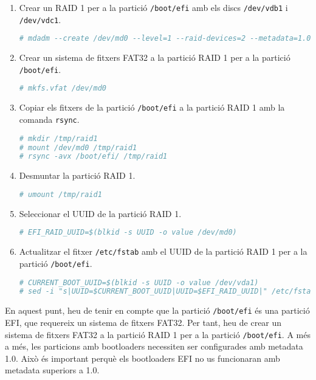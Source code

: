 \begin{enumerate}
        \item Crear un RAID 1 per a la partició \texttt{/boot/efi} amb els discs \texttt{/dev/vdb1} i \texttt{/dev/vdc1}.
\begin{lstlisting}[language=bash, numbers=none, commentstyle=\color{black}]
# mdadm --create /dev/md0 --level=1 --raid-devices=2 --metadata=1.0 /dev/vdb1 /dev/vdc1
\end{lstlisting}
        \item Crear un sistema de fitxers FAT32 a la partició RAID 1 per a la partició \texttt{/boot/efi}.
\begin{lstlisting}[language=bash, numbers=none, commentstyle=\color{black}]
# mkfs.vfat /dev/md0
\end{lstlisting}
        \item Copiar els fitxers de la partició \texttt{/boot/efi} a la partició RAID 1 amb la comanda \texttt{rsync}.
\begin{lstlisting}[language=bash, numbers=none, commentstyle=\color{black}]
# mkdir /tmp/raid1
# mount /dev/md0 /tmp/raid1
# rsync -avx /boot/efi/ /tmp/raid1
\end{lstlisting}
        \item Desmuntar la partició RAID 1.
\begin{lstlisting}[language=bash, numbers=none, commentstyle=\color{black}]
# umount /tmp/raid1
\end{lstlisting}
        \item Seleccionar el UUID de la partició RAID 1.
\begin{lstlisting}[language=bash, numbers=none, commentstyle=\color{black}]
# EFI_RAID_UUID=$(blkid -s UUID -o value /dev/md0)
\end{lstlisting}
        \item Actualitzar el fitxer \texttt{/etc/fstab} amb el UUID de la partició RAID 1 per a la partició \texttt{/boot/efi}.
\begin{lstlisting}[language=bash, numbers=none, commentstyle=\color{black}]
# CURRENT_BOOT_UUID=$(blkid -s UUID -o value /dev/vda1)
# sed -i "s|UUID=$CURRENT_BOOT_UUID|UUID=$EFI_RAID_UUID|" /etc/fstab
\end{lstlisting}
\end{enumerate}

\begin{warning}
En aquest punt, heu de tenir en compte que la partició \texttt{/boot/efi} és una partició EFI, que requereix un sistema de fitxers FAT32. Per tant, heu de crear un sistema de fitxers FAT32 a la partició RAID 1 per a la partició \texttt{/boot/efi}. A més a més, les particions amb bootloaders necessiten ser configurades amb metadata 1.0. Això és important perquè els bootloaders EFI no us funcionaran amb metadata superiors a 1.0.
\end{warning}

